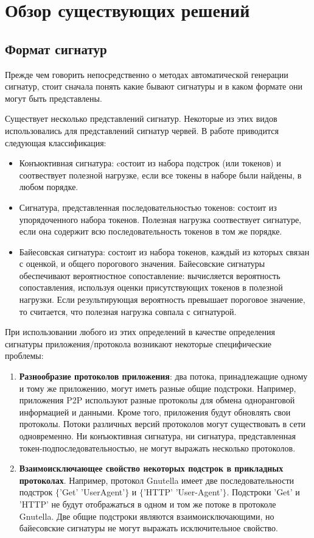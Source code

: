 \section{Обзор существующих решений}
\label{sec:Chapter2} 

\subsection{Формат сигнатур}

Прежде чем говорить непосредственно о методах автоматической генерации сигнатур, стоит сначала понять какие бывают сигнатуры и в каком формате они могут быть представлены.

Существует несколько представлений сигнатур. Некоторые из этих видов использовались для представлений сигнатур червей.
В работе \cite{newsome2005polygraph} приводится следующая классификация:

\begin{itemize}
    \item Конъюктивная сигнатура: cостоит из набора подстрок (или токенов) и соотвествует полезной нагрузке, если все токены в наборе были найдены, в любом порядке.
    \item Сигнатура, представленная последовательностью токенов: состоит из упорядоченного набора токенов.
    Полезная нагрузка соотвествует сигнатуре, если она содержит всю последовательность токенов в том же порядке.
    \item Байесовская сигнатура: состоит из набора токенов, каждый из которых связан с оценкой, и общего порогового значения.
    Байесовские сигнатуры обеспечивают вероятностное сопоставление: вычисляется вероятность сопоставления, используя оценки присутствующих токенов в полезной нагрузки.
    Если результирующая вероятность превышает пороговое значение, то считается, что полезная нагрузка совпала с сигнатурой.
\end{itemize}

При использовании любого из этих определений в качестве определения сигнатуры приложения/протокола возникают некоторые специфические проблемы:

\begin{enumerate}
    \item \textbf{Разнообразие протоколов приложения}: два потока, принадлежащие одному и тому же приложению, могут иметь разные общие подстроки.
    Например, приложения P2P используют разные протоколы для обмена одноранговой информацией и данными. Кроме того, приложения будут обновлять свои протоколы.
    Потоки различных версий протоколов могут существовать в сети одновременно.
    Ни конъюктивная сигнатура, ни сигнатура, представленная токен-подпоследовательностью, не могут выражать несколько протоколов.
    \item \textbf{Взаимоисключающее свойство некоторых подстрок в прикладных протоколах}.
    Например, протокол Gnutella имеет две последовательности подстрок $\{$'Get' 'UserAgent'$\}$ и $\{$'HTTP' 'User-Agent'$\}$.
    Подстроки 'Get' и 'HTTP' не будут отображаться в одном и том же потоке в протоколе Gnutella.
    Две общие подстроки являются взаимоисключающими, но байесовские сигнатуры не могут выражать исключительное свойство.
\end{enumerate}

